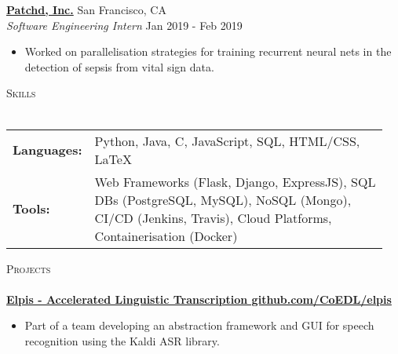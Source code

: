 \documentclass[a4paper]{article}
\newcommand{\lineunder} {
    \vspace*{-8pt} \\
    \hspace*{-10pt} \hrulefill \\
}
\newcommand{\header} [1] {
    {\hspace*{-10pt}\vspace*{6pt} \textsc{#1}}
    \vspace*{-6pt} \lineunder
}
\newenvironment{myitemize}
{   \small
    \vspace{-2pt}
    \begin{itemize}
    \setlength{\itemsep}{0pt}
    \setlength{\parskip}{0pt}
    \setlength{\parsep}{0pt}     }
{ \end{itemize}                  }
\newenvironment{singleitem}
{   \small
    \vspace{0pt}
    \begin{itemize}
    \setlength{\itemsep}{0pt}
    \setlength{\parskip}{0pt}
    \setlength{\parsep}{0pt}   }
{\end{itemize} \vspace{1pt}	}
\begin{document}
\textbf{\href{https://www.patchdmedical.com/}{Patchd, Inc.}} \hfill San Francisco, CA\\
\textit{Software Engineering Intern} \hfill  Jan 2019 - Feb 2019\\
\begin{myitemize} \itemsep 0.5mm
	\item Worked on parallelisation strategies for training recurrent neural nets in the detection of sepsis from vital sign data.
\end{myitemize}

\vspace{0.5mm}
\header{Skills}
\vspace{1.5mm}
\begin{tabular}{p{0.12\linewidth}p{0.83\linewidth}}
	\textbf{Languages:} & Python, Java, C, JavaScript, SQL, HTML/CSS, \LaTeX \\
	\textbf{Tools:} & Web Frameworks (Flask, Django, ExpressJS), SQL DBs (PostgreSQL, MySQL), NoSQL (Mongo), CI/CD (Jenkins, Travis), Cloud Platforms, Containerisation (Docker)
\end{tabular}

\vspace{1.5mm}

\header{Projects}

\textbf{\href{https://github.com/CoEDL/elpis}{Elpis - Accelerated Linguistic Transcription \hfill github.com/CoEDL/elpis}}
\begin{singleitem}
	\item Part of a team developing an abstraction framework and GUI for speech recognition using the Kaldi ASR library.
\end{singleitem}
\end{document}
